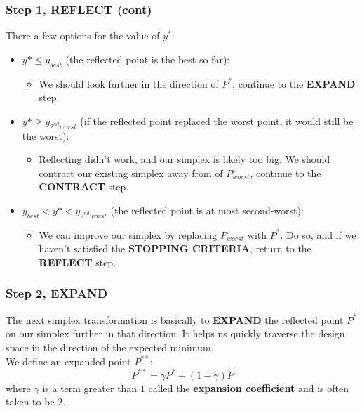 \documentclass[aspectratio=169]{beamer}
\begin{document}
	\begin{frame}
		\frametitle{Step 1, REFLECT (cont)}
		There a few options for the value of $y^*$:\\[\baselineskip]
		\begin{itemize}
			\item $y* \leq y_{best}$ (the reflected point is the best so far):
			\begin{itemize}
				\item We should look further in the direction of $P^*$, continue to the \textbf{EXPAND} step.
			\end{itemize}
		\end{itemize}
		\begin{itemize}
			\item $y* \geq y_{2^{nd} worst}$ (if the reflected point replaced the worst point, it would still be the worst):
			\begin{itemize}
				\item Reflecting didn't work, and our simplex is likely too big. We should contract our existing simplex away from of $P_{worst}$, continue to the \textbf{CONTRACT} step.
			\end{itemize}
		\end{itemize}
		\begin{itemize}
			\item $y_{best}<y*<y_{2^{nd} worst}$ (the reflected point is at most second-worst):
			\begin{itemize}
				\item We can improve our simplex by replacing $P_{worst}$ with $P^*$. Do so, and if we haven't satisfied the \textbf{STOPPING CRITERIA}, return to the \textbf{REFLECT} step.
			\end{itemize}
		\end{itemize}
	\end{frame}

	\begin{frame}
		\frametitle{Step 2, EXPAND}
		The next simplex transformation is basically to \textbf{EXPAND} the reflected point $P^*$ on our simplex further in that direction. It helps us quickly traverse the design space in the direction of the expected minimum. 
		\\[\baselineskip]
		We define an expanded point $P^{**}$:
		$$P^{**}=\gamma P^*+(1-\gamma)\bar{P}$$
		where $\gamma$ is a term greater than $1$ called the \textbf{expansion coefficient} and is often taken to be $2$.
	\end{frame}
\end{document}
